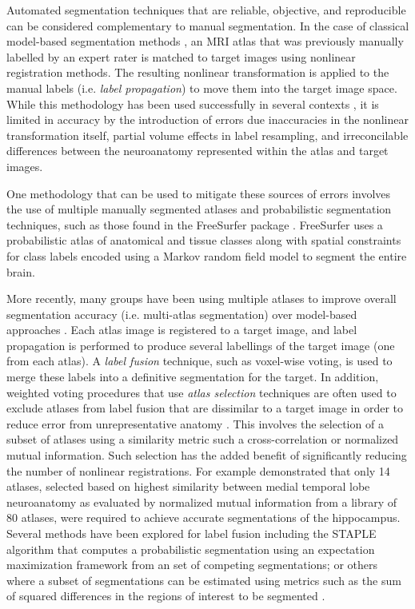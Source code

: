 \documentclass{article}\usepackage{graphicx, color}
\begin{document}
Automated segmentation techniques that are reliable, objective, and reproducible
can be considered complementary to manual segmentation.  In the case of classical
model-based segmentation methods \citep{Haller1997,Csernansky1998}, an MRI atlas
that was previously manually labelled by an expert rater is matched to target
images using nonlinear registration methods.  The resulting nonlinear
transformation is applied to the manual labels (i.e. {\em label propagation}) to
move them into the target image space.  While this methodology has been used
successfully in several contexts
\citep{Chakravarty2008,Chakravarty2009,Collins1995,Haller1997}, it is limited
in accuracy by the introduction of errors due inaccuracies in the nonlinear
transformation itself, partial volume effects in label resampling, and
irreconcilable differences between the neuroanatomy represented within the atlas
and target images.
 
One methodology that can be used to mitigate these sources of errors involves
the use of multiple manually segmented atlases and probabilistic segmentation
techniques, such as those found in the FreeSurfer package \citep{Fischl2002}.
FreeSurfer uses a probabilistic atlas of anatomical and tissue classes along
with spatial constraints for class labels encoded using a Markov random field
model to segment the entire brain.  

More recently, many groups have been using multiple atlases to improve overall
segmentation accuracy (i.e. multi-atlas segmentation) over model-based approaches
\citep{Heckemann2006,Heckemann2011,Collins2010,Lotjonen2010,Aljabar2009,Leung2010,Wolz2010}.
Each atlas image is registered to a target image, and label propagation is
performed to produce several labellings of the target image (one from each
atlas). A {\it label fusion} technique, such as voxel-wise voting, is used to
merge these labels into a definitive segmentation for the target.  In addition,
weighted voting procedures that use {\em atlas selection} techniques are often
used to exclude atlases from label fusion that are dissimilar to a target image
in order to reduce error from unrepresentative anatomy \citep{Aljabar2009}.
This involves the selection of a subset of atlases using a similarity metric
such a cross-correlation \citep{Aljabar2009} or normalized mutual information.
Such selection has the added benefit of significantly reducing the number of
nonlinear registrations.  For example \citet{Collins2010}
demonstrated that only 14 atlases, selected based on highest similarity between
medial temporal lobe neuroanatomy as evaluated by normalized mutual information
\citep{Studholme1999} from a library of 80 atlases, were required to achieve
accurate segmentations of the hippocampus.  Several methods have been explored
for label fusion including the STAPLE algorithm \citep{Warfield2004} that
computes a probabilistic segmentation using an expectation maximization
framework from an set of competing segmentations; or others where a subset of
segmentations can be estimated using metrics such as the sum of squared
differences in the regions of interest to be segmented \citep{Coupe2011}.
\end{document}
